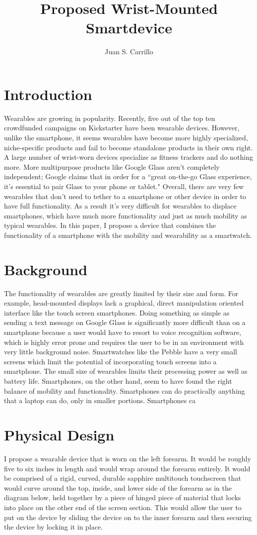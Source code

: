\documentclass[11pt]{article}
\title{Proposed Wrist-Mounted Smartdevice}
\author{Juan S. Carrillo}
\begin{document}
\maketitle
\section{Introduction}
Wearables are growing in popularity. Recently, five out of the top ten crowdfunded campaigns on Kickstarter have been wearable devices. However, unlike the smartphone, it seems wearables have become more highly specialized, niche-specific products and fail to become standalone products in their own right. A large number of wrist-worn devices specialize as fitness trackers and do nothing more. More multipurpose products like Google Glass aren't completely independent; Google claims that in order for a ``great on-the-go Glass experience, it's essential to pair Glass to your phone or tablet." Overall, there are very few wearables that don't need to tether to a smartphone or other device in order to have full functionality. As a result it's very difficult for wearables to displace smartphones, which have much more functionality and just as much mobility as typical wearables. In this paper, I propose a device that combines the functionality of a smartphone with the mobility and wearability as a smartwatch.

\section{Background}
The functionality of wearables are greatly limited by their size and form. For example, head-mounted displays lack a graphical, direct manipulation oriented interface like the touch screen smartphones. Doing something as simple as sending a text message on Google Glass is significantly more difficult than on a smartphone because a user would have to resort to voice recognition software, which is highly error prone and requires the user to be in an environment with very little background noise. Smartwatches like the Pebble have a very small screens which limit the potential of incorporating touch screens into a smartphone. The small size of wearables limits their processing power as well as battery life. Smartphones, on the other hand, seem to have found the right balance of mobility and functionality. Smartphones can do practically anything that a laptop can do, only in smaller portions. Smartphones ca

\section{Physical Design}
I propose a wearable device that is worn on the left forearm. It would be roughly five to six inches in length and would wrap around the forearm entirely. It would be comprised of a rigid, curved, durable sapphire multitouch touchscreen that would curve around the top, inside, and lower side of the forearm as in the diagram below, held together by a piece of hinged piece of material that locks into place on the other end of the screen section. This would allow the user to put on the device by sliding the device on to the inner forearm and then securing the device by locking it in place. 
\end{document}
